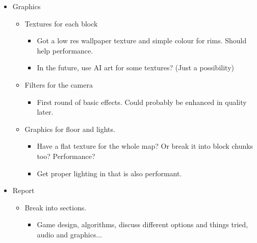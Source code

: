 \begin{itemize}
    \item Graphics
          \begin{itemize}
              \item Textures for each block
                    \begin{itemize}
                        \item Got a low res wallpaper texture and simple colour for rims. Should help performance.
                        \item In the future, use AI art for some textures? (Just a possibility)
                    \end{itemize}
              \item Filters for the camera
                    \begin{itemize}
                        \item First round of basic effects. Could probably be enhanced in quality later.
                    \end{itemize}
              \item Graphics for floor and lights.
                    \begin{itemize}
                        \item Have a flat texture for the whole map? Or break it into block chunks too? Performance?
                        \item Get proper lighting in that is also performant.
                    \end{itemize}
          \end{itemize}
    \item Report
          \begin{itemize}
              \item Break into sections.
                    \begin{itemize}
                        \item Game design, algorithms, discuss different options and things tried, audio and graphics...
                    \end{itemize}
          \end{itemize}
\end{itemize}